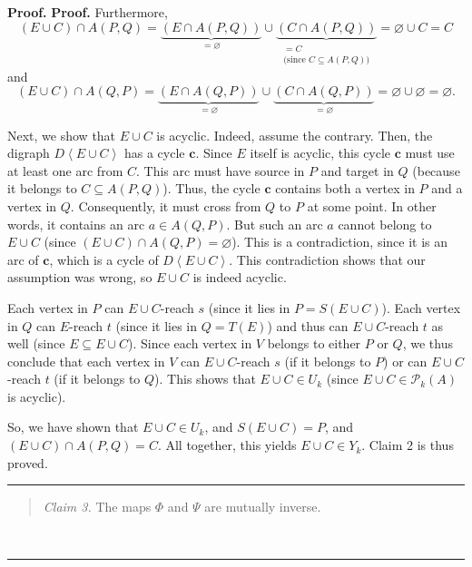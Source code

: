 \documentclass[numbers=enddot,12pt,final,onecolumn,notitlepage]{scrartcl}%
\theoremstyle{definition}
\newenvironment{statement}{\begin{quote}}{\end{quote}}
\newenvironment{proof}[1][Proof]{\noindent\textbf{#1.} }{\ \rule{0.5em}{0.5em}}
\theoremstyle{plainsl}
\begin{document}
\begin{proof}
\begin{proof}
Furthermore,%
\[
\left(  E\cup C\right)  \cap A\left(  P,Q\right)  =\underbrace{\left(  E\cap
A\left(  P,Q\right)  \right)  }_{=\varnothing}\cup\underbrace{\left(  C\cap
A\left(  P,Q\right)  \right)  }_{\substack{=C\\\text{(since }C\subseteq
A\left(  P,Q\right)  \text{)}}}=\varnothing\cup C=C
\]
and%
\[
\left(  E\cup C\right)  \cap A\left(  Q,P\right)  =\underbrace{\left(  E\cap
A\left(  Q,P\right)  \right)  }_{=\varnothing}\cup\underbrace{\left(  C\cap
A\left(  Q,P\right)  \right)  }_{=\varnothing}=\varnothing\cup\varnothing
=\varnothing.
\]


Next, we show that $E\cup C$ is acyclic. Indeed, assume the contrary. Then,
the digraph $D\left\langle E\cup C\right\rangle $ has a cycle $\mathbf{c}$.
Since $E$ itself is acyclic, this cycle $\mathbf{c}$ must use at least one arc
from $C$. This arc must have source in $P$ and target in $Q$ (because it
belongs to $C\subseteq A\left(  P,Q\right)  $). Thus, the cycle $\mathbf{c}$
contains both a vertex in $P$ and a vertex in $Q$. Consequently, it must cross
from $Q$ to $P$ at some point. In other words, it contains an arc $a\in
A\left(  Q,P\right)  $. But such an arc $a$ cannot belong to $E\cup C$ (since
$\left(  E\cup C\right)  \cap A\left(  Q,P\right)  =\varnothing$). This is a
contradiction, since it is an arc of $\mathbf{c}$, which is a cycle of
$D\left\langle E\cup C\right\rangle $. This contradiction shows that our
assumption was wrong, so $E\cup C$ is indeed acyclic.

Each vertex in $P$ can $E\cup C$-reach $s$ (since it lies in $P=S\left(  E\cup
C\right)  $). Each vertex in $Q$ can $E$-reach $t$ (since it lies in
$Q=T\left(  E\right)  $) and thus can $E\cup C$-reach $t$ as well (since
$E\subseteq E\cup C$). Since each vertex in $V$ belongs to either $P$ or $Q$,
we thus conclude that each vertex in $V$ can $E\cup C$-reach $s$ (if it
belongs to $P$) or can $E\cup C$-reach $t$ (if it belongs to $Q$). This shows
that $E\cup C\in U_{k}$ (since $E\cup C\in\mathcal{P}_{k}\left(  A\right)  $
is acyclic).

So, we have shown that $E\cup C\in U_{k}$, and $S\left(  E\cup C\right)  =P$,
and $\left(  E\cup C\right)  \cap A\left(  P,Q\right)  =C$. All together, this
yields $E\cup C\in Y_{k}$. Claim 2 is thus proved.
\end{proof}

\begin{statement}
\textit{Claim 3.} The maps $\Phi$ and $\Psi$ are mutually inverse.
\end{statement}


\end{proof}
\end{document}
